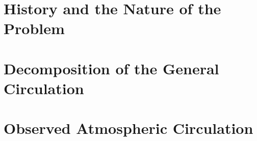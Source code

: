 \newif\ifshoweditorcomments
\showeditorcommentstrue %



\coverpage{\TITLE}{\SUBTITLE}{\AUTHOR}{\DATE}{\SUBJECT}
\newpage
\tableofcontents

\part{History and the Nature of the Problem}
\newpage


\part{Decomposition of the General Circulation}
\newpage


\part{Observed Atmospheric Circulation}
\newpage


